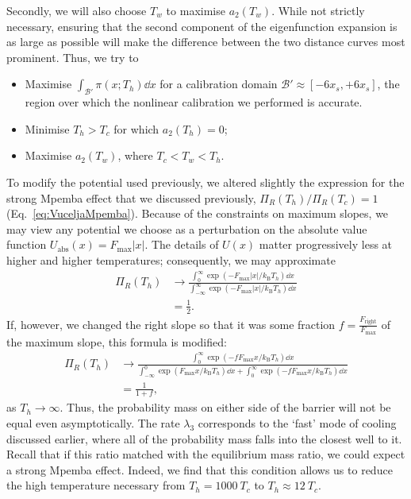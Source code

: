 \documentclass[hyperref={colorlinks=true, urlcolor=blue, citecolor=blue, final, bound}]{sfuthesis}
\newcommand{\kB}{k_{\mathrm{B}}}
\begin{document}
Secondly, we will also choose $T_w$ to maximise $a_2(T_w)$. While not strictly necessary, ensuring that the second component of the eigenfunction expansion is as large as possible will make the difference between the two distance curves most prominent. Thus, we try to
\begin{itemize}
    \item Maximise $\int_{\mathcal B'} \pi(x;T_h)\dd{x}$ for a calibration domain $\mathcal B' \approx [-6x_s,+6x_s]$, the region over which the nonlinear calibration we performed is accurate.
    \item Minimise $T_h>T_c$ for which $a_2(T_h)=0$;
    \item Maximise $a_2(T_w)$, where $T_c<T_w<T_h$.
\end{itemize}

To modify the potential used previously, we altered slightly the expression for the strong Mpemba effect that we discussed previously, $\Pi_R(T_h)/\Pi_R(T_c)=1$ (Eq.~\ref{eq:VuceljaMpemba}). Because of the constraints on maximum slopes, we may view any potential we choose as a perturbation on the absolute value function $U_{\mathrm{abs}}(x)=F_{\max}|x|$. The details of $U(x)$ matter progressively less at higher and higher temperatures; consequently, we may approximate
\begin{align}
    \Pi_R(T_h) &\rightarrow \frac{\int_{0}^{\infty} \exp(-F_{\max}|x|/\kB T_h)\dd{x}}{\int_{-\infty}^{\infty} \exp(-F_{\max}|x|/\kB T_h)\dd{x}}\\
    &= \frac 12.
\end{align}
If, however, we changed the right slope so that it was some fraction $f=\frac{F_{\mathrm{right}}}{F_{\max}}$ of the maximum slope, this formula is modified:
\begin{align}
    \Pi_R(T_h) &\rightarrow \frac{\int_{0}^{\infty} \exp(-fF_{\max}x/\kB T_h)\dd{x}}{\int_{-\infty}^{0} \exp(F_{\max}x/\kB T_h)\dd{x}+\int_{0}^{\infty} \exp(-fF_{\max}x/\kB T_h)\dd{x}}\\
    &= \frac 1{1+f},
\end{align}
as $T_h\rightarrow\infty$. Thus, the probability mass on either side of the barrier will not be equal even asymptotically. The rate $\lambda_3$ corresponds to the `fast' mode of cooling discussed earlier, where all of the probability mass falls into the closest well to it. Recall that if this ratio matched with the equilibrium mass ratio, we could expect a strong Mpemba effect. Indeed, we find that this condition allows us to reduce the high temperature necessary from $T_h = 1000~T_c$ to $T_h \approx 12~T_c$. 
\end{document}
